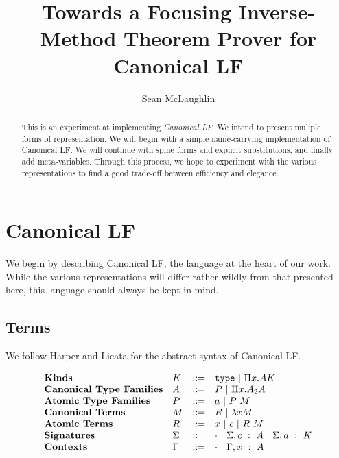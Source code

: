 \documentclass[11pt,twoside]{article}
\title{Towards a Focusing Inverse-Method Theorem Prover for Canonical LF}
\author{Sean McLaughlin}
\begin{document}
 
\maketitle


\begin{abstract} 
This is an experiment at implementing \emph{Canonical LF}.  We intend
to present muliple forms of representation.  We will begin with a
simple name-carrying implementation of Canonical LF.  We will continue
with spine forms and explicit substitutions, and finally add
meta-variables.  Through this process, we hope to experiment with the
various representations to find a good trade-off between efficiency
and elegance.
\end{abstract} 


\section{Canonical LF}
We begin by describing Canonical LF, the language at the
heart of our work.  While the various representations will
differ rather wildly from that presented here, this language
should always be kept in mind.

\subsection{Terms}\label{CLF:types}  
  We follow Harper and Licata \cite{HarperLicataCLF} for the
abstract syntax of Canonical LF. 

$$
\begin{array}{llll}
\textbf{Kinds} & K & ::= & \mathtt{type} \ |\  \Pi x.A{K} \\
\textbf{Canonical Type Families} & A & ::= & P \ |\  \Pi x.A_2{A} \\
\textbf{Atomic Type Families} & P & ::= & a \ |\  P\ M \\
\textbf{Canonical Terms} & M & ::= & R \ |\  \lambda x{M} \\
\textbf{Atomic Terms} & R & ::= &  x \ |\  c \ |\  R\ M\\
\textbf{Signatures} & \Sigma & ::= & \cdot \ |\  \Sigma,c\ :\ A 
\ |\  \Sigma,a\ :\ K\\
\textbf{Contexts} & \Gamma & ::= & \cdot \ |\  \Gamma,x\ :\ A\\
\end{array}
$$
\end{document}
